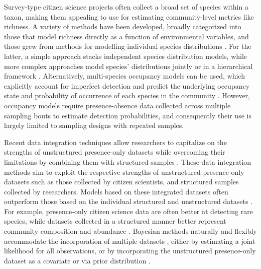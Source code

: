 \documentclass[preprint,review,times,12pt]{elsarticle}
\begin{document}
Survey-type citizen science projects often collect a broad set of species within a taxon, making them appealing to use for estimating community-level metrics like richness. A variety of methods have been developed, broadly categorized into those that model richness directly as a function of environmental variables, and those grew from methods for modelling individual species distributions \citep{Dubuis2011,Guisan2011,Calabrese2014,Biber2019}. For the latter, a simple approach stacks independent species distribution models, while more complex approaches model species' distributions jointly or in a hierarchical framework \citep{Caradima2019}. Alternatively, multi-species occupancy models can be used, which explicitly account for imperfect detection and predict the underlying occupancy state and probability of occurrence of each species in the community \citep{Frishkoff2019,Guillera-Arroita2019,Szewczyk2018,Devarajan2020}. However, occupancy models require presence-absence data collected across multiple sampling bouts to estimate detection probabilities, and consequently their use is largely limited to sampling designs with repeated samples.

Recent data integration techniques allow researchers to capitalize on the strengths of unstructured presence-only datasets while overcoming their limitations by combining them with structured samples \citep{Isaac2019,Miller2019}. These data integration methods aim to exploit the respective strengths of unstructured presence-only datasets such as those collected by citizen scientists, and structured samples collected by researchers. Models based on these integrated datasets often outperform those based on the individual structured and unstructured datasets \citep{Dorazio2014b,Fithian2015,Koshkina2017a}. For example, presence-only citizen science data are often better at detecting rare species, while datasets collected in a structured manner better represent community composition and abundance \citep{Steen2019,Henckel2020,Pernat2020}. Bayesian methods naturally and flexibly accommodate the incorporation of multiple datasets \citep{Clark2005,BeckEtAl2012,Szewczyk2018}, either by estimating a joint likelihood for all observations, or by incorporating the unstructured presence-only dataset as a covariate or via prior distribution \citep{Fletcher2019,Isaac2019,Miller2019}. 
\end{document}
